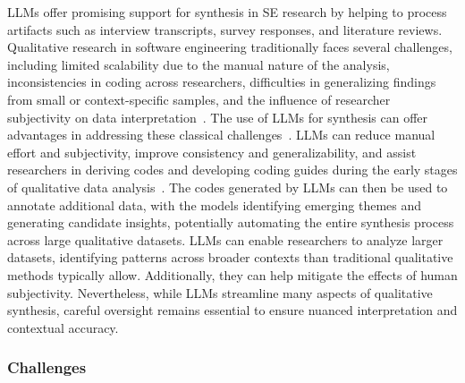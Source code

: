 LLMs offer promising support for synthesis in SE research by helping to process artifacts such as interview transcripts, survey responses, and literature reviews.
Qualitative research in software engineering traditionally faces several challenges, including limited scalability due to the manual nature of the analysis, inconsistencies in coding across researchers, difficulties in generalizing findings from small or context-specific samples, and the influence of researcher subjectivity on data interpretation~\cite{DBLP:journals/ase/BanoHZT24}. 
The use of LLMs for synthesis can offer advantages in addressing these classical challenges~\cite{DBLP:journals/ase/BanoHZT24, barros2024largelanguagemodelqualitative, leça2024applicationsimplicationslargelanguage}.
LLMs can reduce manual effort and subjectivity, improve consistency and generalizability, and assist researchers in deriving codes and developing coding guides during the early stages of qualitative data analysis~\cite{DBLP:conf/chi/ByunVS23,DBLP:journals/ase/BanoHZT24}. The codes generated by LLMs can then be used to annotate additional data, with the models identifying emerging themes and generating candidate insights, potentially automating the entire synthesis process across large qualitative datasets.
LLMs can enable researchers to analyze larger datasets, identifying patterns across broader contexts than traditional qualitative methods typically allow. Additionally, they can help mitigate the effects of human subjectivity. Nevertheless, while LLMs streamline many aspects of qualitative synthesis, careful oversight remains essential to ensure nuanced interpretation and contextual accuracy.


\subsubsection{Challenges}

